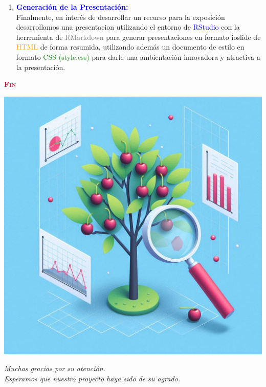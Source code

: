 \documentclass{article}
\begin{document}
\begin{enumerate}
    \item \textbf{\textcolor{blue}{Generación de  la Presentación: }}\\ Finalmente, en interés de desarrollar un recurso para la exposición desarrollamos una presentacion utilizando el entorno de \textcolor{blue}{RStudio} con la herrrmienta de \textcolor{gray}{RMarkdown} para generar presentaciones en formato ioslide de \textcolor{orange}{HTML} de forma resumida, utilizando además un documento de estilo en formato \textcolor{green}{CSS (style.css)} para darle una ambientación innovadora y atractiva a la presentación.
\end{enumerate}

\cleardoublepage
\begin{titlepage}
    \begin{center}
    {\scshape\Huge{\textcolor{crimson}{\textbf{Fin}}} \par}
    \vspace{0.4cm}
    {\includegraphics[width=1.0\textwidth]{img/cherrytrees2.jpeg}}
    \vspace{0.1cm}
    {\itshape\Large \textcolor{customGreen}{\large{\textit{Muchas gracias por su atención.\\Esperamos que nuestro proyecto haya sido de su agrado.}}} \par}
    \end{center}
\end{titlepage}
\end{document}
